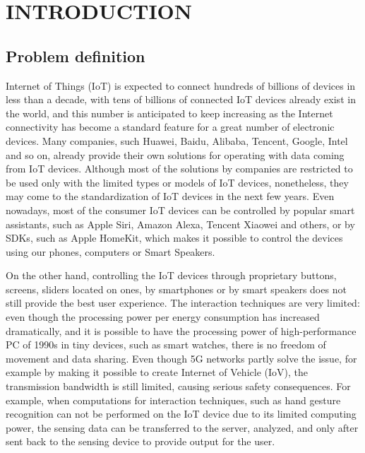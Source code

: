 
\chapter{INTRODUCTION}

\section{Problem definition}

Internet of Things (IoT) is expected to connect hundreds of billions of devices in less than a decade\cite{simiscuka_synchronisation_2018}, with tens of billions of connected IoT devices already exist in the world, and this number is anticipated to keep increasing as the Internet connectivity has become a standard feature for a great number of electronic devices\cite{hu_virtual_2021}. Many companies, such Huawei, Baidu, Alibaba, Tencent, Google, Intel and so on, already provide their own solutions for operating with data coming from IoT devices. Although most of the solutions by companies are restricted to be used only with the limited types or models of IoT devices, nonetheless, they may come to the standardization of IoT devices in the next few years. Even nowadays, most of the consumer IoT devices can be controlled by popular smart assistants, such as Apple Siri, Amazon Alexa, Tencent Xiaowei and others, or by SDKs, such as Apple HomeKit, which makes it possible to control the devices using our phones, computers or Smart Speakers.

On the other hand, controlling the IoT devices through proprietary buttons, screens, sliders located on ones, by smartphones or by smart speakers does not still provide the best user experience. The interaction techniques are very limited: even though the processing power per energy consumption has increased dramatically, and it is possible to have the processing power of high-performance PC of 1990s in tiny devices, such as smart watches, there is no freedom of movement and data sharing. Even though 5G networks partly solve the issue, for example by making it possible to create Internet of Vehicle (IoV), the transmission bandwidth is still limited, causing serious safety consequences\cite{hu_virtual_2021}. For example, when computations for interaction techniques, such as hand gesture recognition can not be performed on the IoT device due to its limited computing power, the sensing data can be transferred to the server, analyzed, and only after sent back to the sensing device to provide output for the user.

